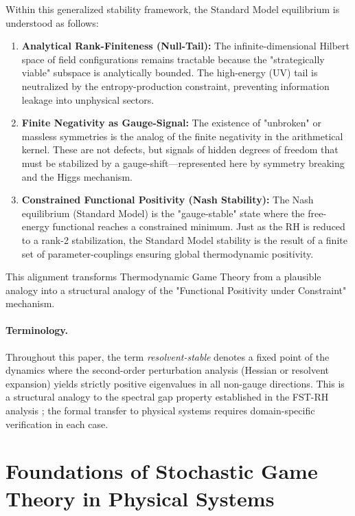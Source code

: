 \documentclass[12pt,a4paper]{article}
\theoremstyle{remark}
\begin{document}
Within this generalized stability framework, the Standard Model equilibrium is understood as follows:
\begin{enumerate}[label=\alph*)]
    \item \textbf{Analytical Rank-Finiteness (Null-Tail):} The infinite-dimensional Hilbert space of field configurations remains tractable because the "strategically viable" subspace is analytically bounded. The high-energy (UV) tail is neutralized by the entropy-production constraint, preventing information leakage into unphysical sectors.
    \item \textbf{Finite Negativity as Gauge-Signal:} The existence of "unbroken" or massless symmetries is the analog of the finite negativity in the arithmetical kernel. These are not defects, but signals of hidden degrees of freedom that must be stabilized by a gauge-shift—represented here by symmetry breaking and the Higgs mechanism.
    \item \textbf{Constrained Functional Positivity (Nash Stability):} The Nash equilibrium (Standard Model) is the "gauge-stable" state where the free-energy functional reaches a constrained minimum. Just as the RH is reduced to a rank-2 stabilization, the Standard Model stability is the result of a finite set of parameter-couplings ensuring global thermodynamic positivity.
\end{enumerate}

This alignment transforms Thermodynamic Game Theory from a plausible analogy into a structural analogy of the "Functional Positivity under Constraint" mechanism.

\paragraph{Terminology.} Throughout this paper, the term \emph{resolvent-stable} denotes a fixed point of the dynamics where the second-order perturbation analysis (Hessian or resolvent expansion) yields strictly positive eigenvalues in all non-gauge directions. This is a structural analogy to the spectral gap property established in the FST-RH analysis \citep{GeigerRH2026b}; the formal transfer to physical systems requires domain-specific verification in each case.

\section{Foundations of Stochastic Game Theory in Physical Systems}
\label{sec:foundations}
\end{document}
